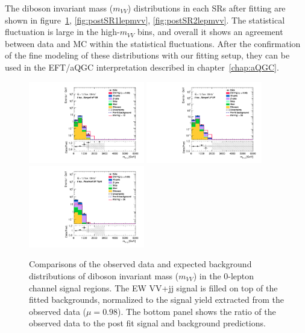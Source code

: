 The diboson invariant mass ($m_{VV}$) distributions in each SRs after fitting are shown in figure~\ref{fig:postSR0lepmvv}, \ref{fig:postSR1lepmvv}, \ref{fig:postSR2lepmvv}. The statistical fluctuation is large in the high-$m_{VV}$ bins, and overall it shows an agreement between data and MC within the statistical fluctuations. After the confirmation of the fine modeling of these distributions with our fitting setup, they can be used in the EFT/aQGC interpretation described in chapter~\ref{chap:aQGC}.
\begin{figure}[]
    \centering
    \includegraphics[width=0.45\textwidth]{figures/PostFit/Region_distMtvvJ_DSRVBSHP_BMin0_J0_incJet1_L0_T0_incFat1_Y6051_incTag1_Fat1_GlobalFit_unconditionnal_mu1log.pdf}
    \includegraphics[width=0.45\textwidth]{figures/PostFit/Region_distMtvvJ_DSRVBSLP_BMin0_J0_incJet1_L0_T0_incFat1_Y6051_incTag1_Fat1_GlobalFit_unconditionnal_mu1log.pdf}
    \includegraphics[width=0.45\textwidth]{figures/PostFit/Region_distMtvvjj_DSRVBSFid_BMin0_T0_Y6051_incTag1_J2_L0_incJet1_GlobalFit_unconditionnal_mu1log.pdf}
      \caption{Comparisons of the observed data and expected background distributions of diboson invariant mass ($m_{VV}$) in the 0-lepton channel signal regions. The EW VV+jj signal is filled on top of the fitted backgrounds, normalized to the signal yield extracted from the observed data ($\mu = 0.98$). The bottom panel shows the ratio of the observed data to the post fit signal and background predictions.}
      \label{fig:postSR0lepmvv}
\end{figure}
